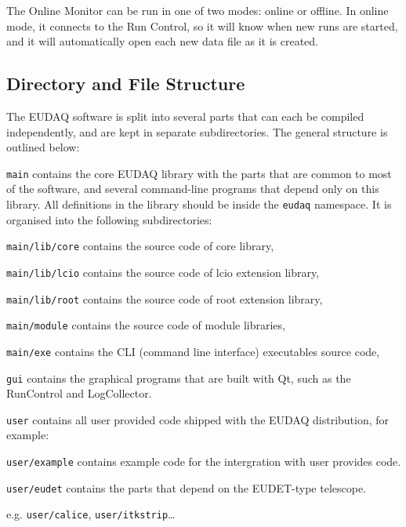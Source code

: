The Online Monitor can be run in one of two modes: online or offline.
In online mode, it connects to the Run Control, so it will know when new runs are started,
and it will automatically open each new data file as it is created.



\subsection{Directory and File Structure}
The EUDAQ software is split into several parts that can each be compiled independently,
and are kept in separate subdirectories.
The general structure is outlined below:

\begin{myitemize}
\item \texttt{main}
  contains the core EUDAQ library with the parts that are common to most of the software,
  and several command-line programs that depend only on this library.
  All definitions in the library should be inside the \texttt{eudaq} namespace.
  It is organised into the following subdirectories:
  \begin{myitemize}
  \item \texttt{main/lib/core}
    contains the source code of core library,
  \item \texttt{main/lib/lcio}
    contains the source code of lcio extension library,
  \item \texttt{main/lib/root}
    contains the source code of root extension library,
  \item \texttt{main/module}
    contains the source code of module libraries,
  \item \texttt{main/exe}
    contains the CLI (command line interface) executables source code,
  \end{myitemize}
\item \texttt{gui}
  contains the graphical programs that are built with Qt, such as the RunControl and LogCollector.
\item \texttt{user}
  contains all user provided code shipped with the EUDAQ
  distribution, for example:
  \begin{myitemize}
\item \texttt{user/example}
  contains example code for the intergration with user provides code.
\item \texttt{user/eudet}
  contains the parts that depend on the EUDET-type telescope.
\item e.g. \texttt{user/calice}, \texttt{user/itkstrip}\ldots{}

\end{myitemize}
\end{myitemize}
